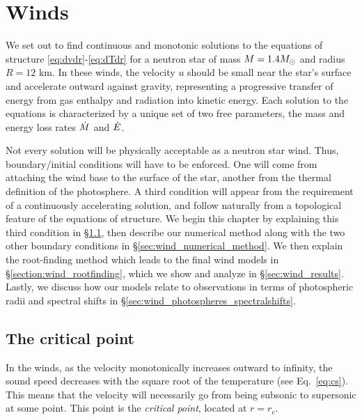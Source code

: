 \documentclass[../main.tex]{subfiles}
\begin{document}
\chapter{Winds}\label{chapter3}
We set out to find continuous and monotonic solutions to the equations of structure \eqref{eq:dvdr}-\eqref{eq:dTdr} for a neutron star of mass $M=1.4M_\odot$ and radius $R=12$ km. In these winds, the velocity $u$ should be small near the star's surface and accelerate outward against gravity, representing a progressive transfer of energy from gas enthalpy and radiation into kinetic energy.  Each solution to the equations is characterized by a unique set of two free parameters, the mass and energy loss rates $\dot{M}$ and $\dot{E}$. 

Not every solution will be physically acceptable as a neutron star wind. Thus, boundary/initial conditions will have to be enforced. One will come from attaching the wind base to the surface of the star, another from the thermal definition of the photosphere. A third condition will appear from the requirement of a continuously accelerating solution, and follow naturally from a topological feature of the equations of structure. We begin this chapter by explaining this third condition in \S\ref{sec:critical_point}, then describe our numerical method along with the two other boundary conditions in \S\ref{sec:wind_numerical_method}. We then explain the root-finding method which leads to the final wind models in \S\ref{section:wind_rootfinding}, which we show and analyze in \S\ref{sec:wind_results}. Lastly, we discuss how our models relate to observations in terms of photospheric radii and spectral shifts in \S\ref{sec:wind_photospheres_spectralshifts}.

\section{The critical point}\label{sec:critical_point}
In the winds, as the velocity monotonically increases outward to infinity, the sound speed decreases with the square root of the temperature (see Eq.~\ref{eq:cs}). This means that the velocity will necessarily go from being subsonic to supersonic at some point. This point is the \textit{critical point}, located at $r=r_c$.  
\end{document}
